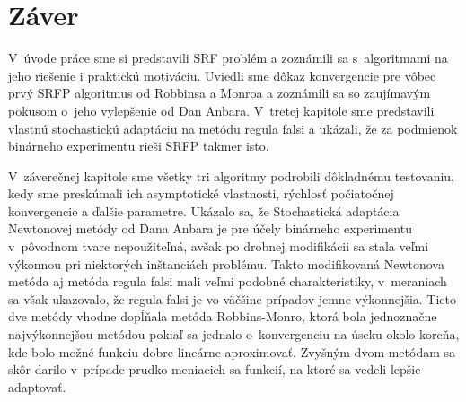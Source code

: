 \section{Záver}
V~úvode práce sme si predstavili SRF problém a zoznámili sa s~algoritmami na
jeho riešenie i praktickú motiváciu. Uviedli sme dôkaz konvergencie pre vôbec
prvý SRFP algoritmus od Robbinsa a Monroa\cite{monro} a zoznámili sa so
zaujímavým pokusom o~jeho vylepšenie od Dan Anbara\cite{anbar}. V~tretej
kapitole sme predstavili vlastnú stochastickú adaptáciu na metódu regula falsi a
ukázali, že za podmienok binárneho experimentu rieši SRFP takmer isto. 

V~záverečnej kapitole sme všetky tri algoritmy podrobili dôkladnému
testovaniu, kedy sme preskúmali ich asymptotické vlastnosti, rýchlosť
počiatočnej konvergencie a ďalšie parametre.  Ukázalo sa, že Stochastická
adaptácia Newtonovej metódy\cite{anbar} od Dana Anbara je pre účely binárneho
experimentu v~pôvodnom tvare nepoužiteľná, avšak po drobnej modifikácii sa stala
veľmi výkonnou pri niektorých inštanciách problému. Takto modifikovaná Newtonova
metóda aj metóda regula falsi mali veľmi podobné charakteristiky, v~meraniach sa
však ukazovalo, že regula falsi je vo väčšine prípadov jemne výkonnejšia. Tieto
dve metódy vhodne dopĺňala metóda Robbins-Monro\cite{monro}, ktorá bola
jednoznačne najvýkonnejšou metódou pokiaľ sa jednalo o~konvergenciu na úseku
okolo koreňa, kde bolo možné funkciu dobre lineárne aproximovať. Zvyšným dvom
metódam sa skôr darilo v~prípade prudko meniacich sa funkcií, na ktoré sa vedeli
lepšie adaptovať.
